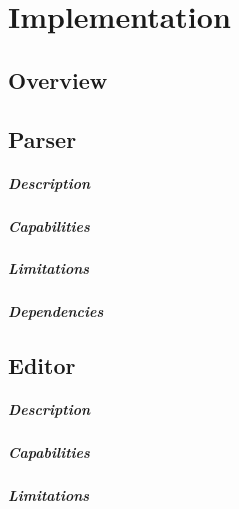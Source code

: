 
%

\chapter{Implementation}
\label{cha:test}

\section{Overview} %
\label{sec:overview}

\section{Parser} %
\label{sec:parser}

\paragraph{Description}
\paragraph{Capabilities}
\paragraph{Limitations}
\paragraph{Dependencies}

\section{Editor} %
\label{sec:editor}

\paragraph{Description}
\paragraph{Capabilities}
\paragraph{Limitations}
